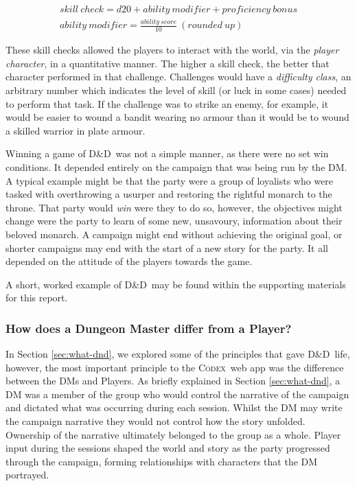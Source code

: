 \documentclass[final]{cmpreport}
\newcommand{\dnd}{D\&D}
\newcommand{\Codex}{\textsc{Codex}}
\begin{document}
			\begin{gather} \label{eq:skill-check}
			skill \ check = d20 + ability \ modifier + proficiency \ bonus \\
			ability \ modifier = \frac{ability \ score}{10} \ (rounded \ up) 
			\end{gather}
			
			These skill checks allowed the players to interact with the world, via the \textit{player character}, in a quantitative manner. The higher a skill check, the better that character performed in that challenge. Challenges would have a \emph{difficulty class}, an arbitrary number which indicates the level of skill (or luck in some cases) needed to perform that task. If the challenge was to strike an enemy, for example, it would be easier to wound a bandit wearing no armour than it would be to wound a skilled warrior in plate armour. 
			
			Winning a game of \dnd \ was not a simple manner, as there were no set win conditions. It depended entirely on the campaign that was being run by the DM. A typical example might be that the party were a group of loyalists who were tasked with overthrowing a usurper and restoring the rightful monarch to the throne. That party would \emph{win} were they to do so, however, the objectives might change were the party to learn of some new, unsavoury, information about their beloved monarch. A campaign might end without achieving the original goal, or shorter campaigns may end with the start of a new story for the party. It all depended on the attitude of the players towards the game.
			
			A short, worked example of \dnd \ may be found within the supporting materials for this report.
			
			\subsubsection{How does a Dungeon Master differ from a Player?} \label{sec:dm-vs-player}
			In Section \ref{sec:what-dnd}, we explored some of the principles that gave \dnd \ life, however, the most important principle to the \Codex \ web app was the difference between the DMs and Players. As briefly explained in Section \ref{sec:what-dnd}, a DM was a member of the group who would control the narrative of the campaign and dictated what was occurring during each session. Whilst the DM may write the campaign narrative they would not control how the story unfolded. Ownership of the narrative ultimately belonged to the group as a whole. Player input during the sessions shaped the world and story as the party progressed through the campaign, forming relationships with characters that the DM portrayed. 
			
\end{document}
